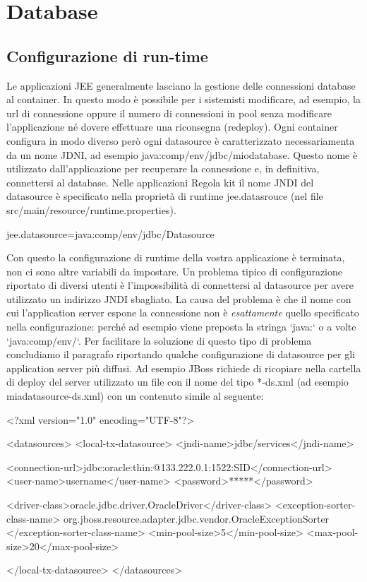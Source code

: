 \chapter{Database}\label{chap:database}

\section{Configurazione di run-time}
Le applicazioni JEE generalmente lasciano la gestione delle connessioni database al container. In questo modo è possibile per i sistemisti modificare, ad esempio, la url di connessione oppure il numero di connessioni in pool senza modificare l'applicazione né dovere effettuare una riconsegna (redeploy). Ogni container configura in modo diverso però ogni datasource è caratterizzato necessariamenta da un nome JDNI, ad esempio java:comp/env/jdbc/miodatabase. Questo nome è utilizzato dall'applicazione per recuperare la connessione e, in definitiva, connettersi al database. 
Nelle applicazioni Regola kit il nome JNDI del datasource è specificato nella proprietà di runtime jee.datasrouce (nel file  src/main/resource/runtime.properties). 

\begin{bash}
jee.datasource=java:comp/env/jdbc/Datasource
\end{bash}

Con questo la configurazione di runtime della vostra applicazione è terminata, non ci sono altre variabili da impostare. Un problema tipico di configurazione riportato di diversi utenti è l'impossibilità di connettersi al datasource per avere utilizzato un indirizzo JNDI sbagliato. La causa del problema  è che il nome con cui l'application server espone la connessione non è \emph{esattamente} quello specificato nella configurazione: perché ad esempio viene preposta la stringa `java:` o a volte `java:comp/env/`.  Per facilitare la soluzione di questo tipo di problema concludiamo il paragrafo riportando qualche configurazione di datasource per gli application server più diffusi. Ad esempio  JBoss richiede di ricopiare nella cartella di deploy del server utilizzato un file con il nome del tipo *-ds.xml (ad esempio miadatasource-ds.xml) con un contenuto simile al seguente:

\begin{xml}
<?xml version="1.0" encoding="UTF-8"?>

<datasources>
 <local-tx-datasource>
    <jndi-name>jdbc/services</jndi-name> 
    
    <connection-url>jdbc:oracle:thin:@133.222.0.1:1522:SID</connection-url>
    <user-name>username</user-name>
    <password>*****</password>
  
    <driver-class>oracle.jdbc.driver.OracleDriver</driver-class>
    <exception-sorter-class-name>
       org.jboss.resource.adapter.jdbc.vendor.OracleExceptionSorter
    </exception-sorter-class-name>
    <min-pool-size>5</min-pool-size>
    <max-pool-size>20</max-pool-size>

 </local-tx-datasource>
</datasources>
\end{xml}

